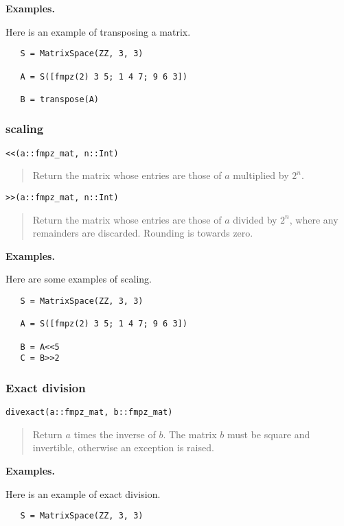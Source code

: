 \documentclass[a4paper,10pt]{article}
\newcommand{\desc}[1]{\vspace{-3mm}\begin{quote}#1\end{quote}}
\begin{document}
{{\textbf{Examples.}

Here is an example of transposing a matrix.

\begin{lstlisting}
   S = MatrixSpace(ZZ, 3, 3)

   A = S([fmpz(2) 3 5; 1 4 7; 9 6 3])
 
   B = transpose(A)
\end{lstlisting}

\subsubsection{scaling}

\begin{lstlisting}
<<(a::fmpz_mat, n::Int)
\end{lstlisting}

\desc{Return the matrix whose entries are those of $a$ multiplied by $2^n$.}

\begin{lstlisting}
>>(a::fmpz_mat, n::Int)
\end{lstlisting}

\desc{Return the matrix whose entries are those of $a$ divided by $2^n$, where
any remainders are discarded. Rounding is towards zero.}

\textbf{Examples.}

Here are some examples of scaling.

\begin{lstlisting}
   S = MatrixSpace(ZZ, 3, 3)

   A = S([fmpz(2) 3 5; 1 4 7; 9 6 3])
 
   B = A<<5
   C = B>>2
\end{lstlisting}

\subsubsection{Exact division}

\begin{lstlisting}
divexact(a::fmpz_mat, b::fmpz_mat)
\end{lstlisting}

\desc{Return $a$ times the inverse of $b$. The matrix $b$ must be square and
invertible, otherwise an exception is raised.}

\textbf{Examples.}

Here is an example of exact division.

\begin{lstlisting}
   S = MatrixSpace(ZZ, 3, 3)


\end{lstlisting}}}
\end{document}

